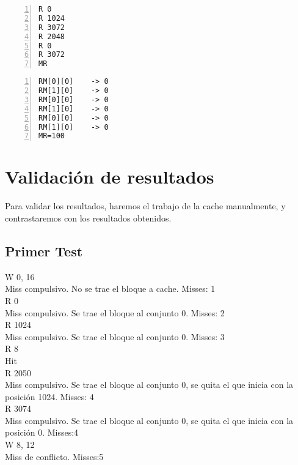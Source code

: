 \documentclass[11pt,a4paper, spanish]{article}
\begin{document}
\begin{lstlisting}[numbers=left, tabsize=2, basicstyle=\fontsize{11}{13}\ttfamily, frame=single, caption={prueba5.mem}]
R 0
R 1024
R 3072
R 2048
R 0
R 3072
MR
\end{lstlisting}

\begin{lstlisting}[numbers=left, tabsize=2, basicstyle=\fontsize{11}{13}\ttfamily, frame=single, caption={Resultado prueba5.mem}]
RM[0][0]    -> 0
RM[1][0]    -> 0
RM[0][0]    -> 0
RM[1][0]    -> 0
RM[0][0]    -> 0
RM[1][0]    -> 0
MR=100
\end{lstlisting}

\section{Validación de resultados}

Para validar los resultados, haremos el trabajo de la cache manualmente, y contrastaremos con los resultados obtenidos.

\subsection{Primer Test}

W 0, 16\\ 
Miss compulsivo. No se trae el bloque a cache. Misses: 1\\

R 0\\ 
Miss compulsivo. Se trae el bloque al conjunto 0. Misses: 2\\

R 1024\\
Miss compulsivo. Se trae el bloque al conjunto 0. Misses: 3\\

R 8 \\
Hit\\

R 2050\\
Miss compulsivo. Se trae el bloque al conjunto 0, se quita el que inicia con la posición 1024. Misses: 4\\

R 3074 \\
Miss compulsivo. Se trae el bloque al conjunto 0, se quita el que inicia con la posición 0. Misses:4\\


W 8, 12 \\
Miss de conflicto. Misses:5\\
\end{document}
